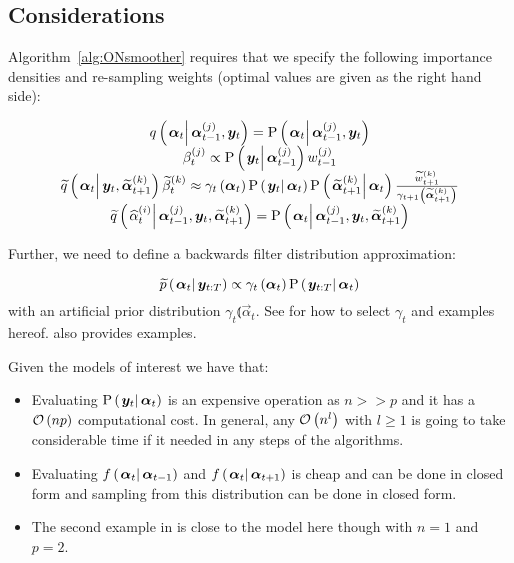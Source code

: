 \subsection*{Considerations}
Algorithm~\ref{alg:ONsmoother} requires that we specify the following importance densities and re-sampling weights (optimal values are given as the right hand side):

\begin{equation}\begin{matrix}
	\IDC{\vec{\alpha}_t}{\partic{\vec{\alpha}}{t-1}{j}, \vec{y}_t} = \propC{\vec{\alpha}_t}{\partic{\vec{\alpha}}{t-1}{j}, \vec{y}_t} \\
	\partic{\beta}{t}{j} \propto \propC{\vec{y}_t}{\partic{\vec{\alpha}}{t-1}{j}}\partic{w}{t-1}{j} \\
%
	\IDAproxC{\vec{\alpha}_t}{\vec{y}_t, \particB{\vec{\alpha}}{t + 1}{k}}\particB{\beta}{t}{k} \approx %
		\gamma_t\Lparen{\vec{\alpha}_t}
		\propC{\vec{y}_t}{\vec{\alpha}_t}
		\propC{\particB{\vec{\alpha}}{t + 1}{k}}{\vec{\alpha}_t}
		\frac{\particB{w}{t + 1}{k}}{\gamma_{t + 1}\Lparen{\particB{\vec{\alpha}}{t + 1}{k}}} \\
%
	\IDAproxC{\particS{\alpha}{t}{i}}{\partic{\vec{\alpha}}{t-1}{j},\vec{y}_t, \particB{\vec{\alpha}}{t+1}{k}} = 
		\propC{\vec{\alpha}_t}{\partic{\vec{\alpha}}{t-1}{j},\vec{y}_t, \particB{\vec{\alpha}}{t+1}{k}}
\end{matrix}\end{equation}

Further, we need to define a backwards filter distribution approximation:

\begin{equation}
	\propAproxC{\vec{\alpha}_t}{\vec{y}_{t:T}} \propto \gamma_t \Lparen{\vec{\alpha}_t}\propC{\vec{y}_{t:T}}{\vec{\alpha}_t}
\end{equation}%
%
with an artificial prior distribution $\gamma_t \Lparen{\vec{\alpha}_t}$. See \cite{briers10} for how to select $\gamma_t$ and examples hereof. \cite{fearnhead10} also provides examples. 

Given the models of interest we have that:

\begin{itemize}
	\item Evaluating $\propC{\vec{y}_t}{\vec{\alpha}_t}$ is an expensive operation as $n >> p$ and it has a $\mathcal{O}\left( np\right)$ computational cost. In general, any $\mathcal{O}\left( n^l\right)$ with $l \geq 1$ is going to take considerable time if it needed in any steps of the algorithms. 
	\item Evaluating $\optorC{f}{\vec{\alpha}_t}{\vec{\alpha}_{t -1}}$ and $\optorC{f}{\vec{\alpha}_t}{\vec{\alpha}_{t + 1}}$ is cheap and can be done in closed form and sampling from this distribution can be done in closed form.
	\item The second example in \cite{fearnhead10} is close to the model here though with $n = 1$ and $p = 2$. 
\end{itemize}

